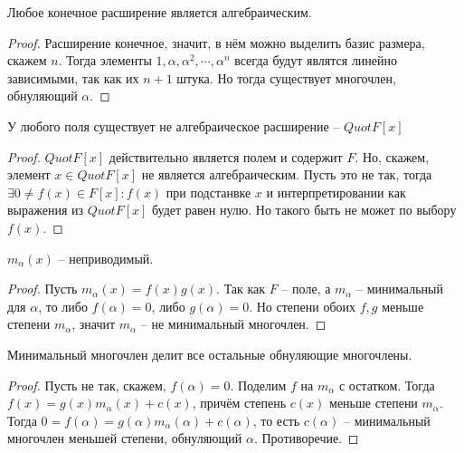 \documentclass{article}
\begin{document}
\begin{statement}
    Любое конечное расширение является алгебраическим.
\end{statement}

\begin{proof}
    Расширение конечное, значит, в нём можно выделить базис размера, скажем $n$. Тогда элементы $1, \alpha, \alpha^2,
    \cdots, \alpha^n$ всегда будут являтся линейно зависимыми, так как их $n + 1$ штука. Но тогда существует многочлен,
    обнуляющий $\alpha$.
\end{proof}

\begin{statement}
    У любого поля существует не алгебраическое расширение -- $Quot F[x]$
\end{statement}

\begin{proof}
    $Quot F[x]$ действительно является полем и содержит $F$. Но, скажем, элемент $x \in Quot F[x]$ не является
    алгебраическим. Пусть это не так, тогда $\exists 0 \neq f(x) \in F[x]: f(x)$ при подстанвке $x$ и интерпретировании как
    выражения из $Quot F[x]$ будет равен нулю. Но такого быть не может по выбору $f(x)$.
\end{proof}

\begin{statement}
    $m_{\alpha}(x)$ -- неприводимый.
\end{statement}

\begin{proof}
    Пусть $m_{\alpha}(x) = f(x)g(x)$. Так как $F$ -- поле, а $m_{\alpha}$ -- минимальный для $\alpha$, то либо
    $f(\alpha) = 0$, либо $g(\alpha) = 0$. Но степени обоих $f, g$ меньше степени $m_{\alpha}$, значит $m_{\alpha}$ --
    не минимальный многочлен.
\end{proof}

\begin{statement}
    Минимальный многочлен делит все остальные обнуляющие многочлены.
\end{statement}

\begin{proof}
    Пусть не так, скажем, $f(\alpha) = 0$. Поделим $f$ на $m_{\alpha}$ с остатком. Тогда $f(x) = g(x) m_{\alpha}(x) +
    c(x)$, причём степень $c(x)$ меньше степени $m_{\alpha}$. Тогда $0 = f(\alpha) = g(\alpha) m_{\alpha}(\alpha) +
    c(\alpha)$, то есть $c(\alpha)$ -- минимальный многочлен меньшей степени, обнуляющий $\alpha$. Противоречие.
\end{proof}
\end{document}
